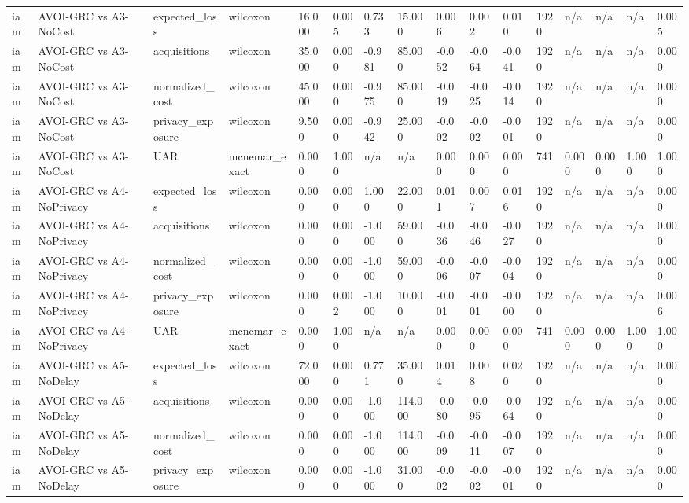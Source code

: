 \begin{table}[!ht]
{\begin{tabular}{llllllllllllllll}
iam & AVOI-GRC vs A3-NoCost & expected\_loss & wilcoxon & 16.000 & 0.005 & 0.733 & 15.000 & 0.006 & 0.002 & 0.010 & 1920 & n/a & n/a & n/a & 0.005 \\
iam & AVOI-GRC vs A3-NoCost & acquisitions & wilcoxon & 35.000 & 0.000 & -0.981 & 85.000 & -0.052 & -0.064 & -0.041 & 1920 & n/a & n/a & n/a & 0.000 \\
iam & AVOI-GRC vs A3-NoCost & normalized\_cost & wilcoxon & 45.000 & 0.000 & -0.975 & 85.000 & -0.019 & -0.025 & -0.014 & 1920 & n/a & n/a & n/a & 0.000 \\
iam & AVOI-GRC vs A3-NoCost & privacy\_exposure & wilcoxon & 9.500 & 0.000 & -0.942 & 25.000 & -0.002 & -0.002 & -0.001 & 1920 & n/a & n/a & n/a & 0.000 \\
iam & AVOI-GRC vs A3-NoCost & UAR & mcnemar\_exact & 0.000 & 1.000 & n/a & n/a & 0.000 & 0.000 & 0.000 & 741 & 0.000 & 0.000 & 1.000 & 1.000 \\
iam & AVOI-GRC vs A4-NoPrivacy & expected\_loss & wilcoxon & 0.000 & 0.000 & 1.000 & 22.000 & 0.011 & 0.007 & 0.016 & 1920 & n/a & n/a & n/a & 0.000 \\
iam & AVOI-GRC vs A4-NoPrivacy & acquisitions & wilcoxon & 0.000 & 0.000 & -1.000 & 59.000 & -0.036 & -0.046 & -0.027 & 1920 & n/a & n/a & n/a & 0.000 \\
iam & AVOI-GRC vs A4-NoPrivacy & normalized\_cost & wilcoxon & 0.000 & 0.000 & -1.000 & 59.000 & -0.006 & -0.007 & -0.004 & 1920 & n/a & n/a & n/a & 0.000 \\
iam & AVOI-GRC vs A4-NoPrivacy & privacy\_exposure & wilcoxon & 0.000 & 0.002 & -1.000 & 10.000 & -0.001 & -0.001 & -0.000 & 1920 & n/a & n/a & n/a & 0.006 \\
iam & AVOI-GRC vs A4-NoPrivacy & UAR & mcnemar\_exact & 0.000 & 1.000 & n/a & n/a & 0.000 & 0.000 & 0.000 & 741 & 0.000 & 0.000 & 1.000 & 1.000 \\
iam & AVOI-GRC vs A5-NoDelay & expected\_loss & wilcoxon & 72.000 & 0.000 & 0.771 & 35.000 & 0.014 & 0.008 & 0.020 & 1920 & n/a & n/a & n/a & 0.000 \\
iam & AVOI-GRC vs A5-NoDelay & acquisitions & wilcoxon & 0.000 & 0.000 & -1.000 & 114.000 & -0.080 & -0.095 & -0.064 & 1920 & n/a & n/a & n/a & 0.000 \\
iam & AVOI-GRC vs A5-NoDelay & normalized\_cost & wilcoxon & 0.000 & 0.000 & -1.000 & 114.000 & -0.009 & -0.011 & -0.007 & 1920 & n/a & n/a & n/a & 0.000 \\
iam & AVOI-GRC vs A5-NoDelay & privacy\_exposure & wilcoxon & 0.000 & 0.000 & -1.000 & 31.000 & -0.002 & -0.002 & -0.001 & 1920 & n/a & n/a & n/a & 0.000 \\

\end{tabular}}
\end{table}
